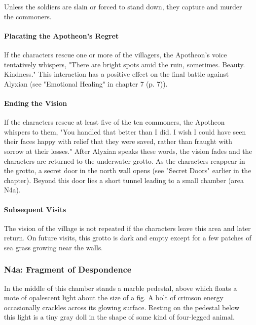 \documentclass[a4paper, 11pt, bg=full, twocolumn, nooutline]{dndbook}
\begin{document}
Unless the soldiers are slain or forced to stand down, they capture and murder the commoners.

\paragraph{Placating the Apotheon's Regret}

If the characters rescue one or more of the villagers, the Apotheon's voice tentatively whispers, "There are bright spots amid the ruin, sometimes. Beauty. Kindness." This interaction has a positive effect on the final battle against Alyxian (see "Emotional Healing" in chapter 7 (p. 7)).

\paragraph{Ending the Vision}

If the characters rescue at least five of the ten commoners, the Apotheon whispers to them, "You handled that better than I did. I wish I could have seen their faces happy with relief that they were saved, rather than fraught with sorrow at their losses." After Alyxian speaks these words, the vision fades and the characters are returned to the underwater grotto. As the characters reappear in the grotto, a secret door in the north wall opens (see "Secret Doors" earlier in the chapter). Beyond this door lies a short tunnel leading to a small chamber (area N4a).

\paragraph{Subsequent Visits}

The vision of the village is not repeated if the characters leave this area and later return. On future visits, this grotto is dark and empty except for a few patches of sea grass growing near the walls.

\subsubsection{N4a: Fragment of Despondence}

\begin{DndReadAloud}
In the middle of this chamber stands a marble pedestal, above which floats a mote of opalescent light about the size of a fig. A bolt of crimson energy occasionally crackles across its glowing surface. Resting on the pedestal below this light is a tiny gray doll in the shape of some kind of four-legged animal.
\end{DndReadAloud}
\end{document}
